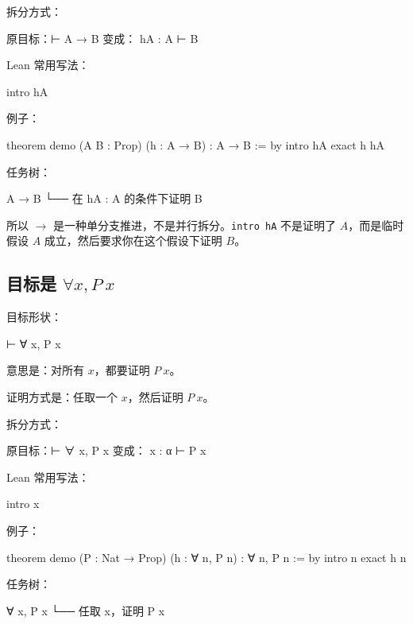 \documentclass[UTF8,12pt]{ctexart}
\begin{document}
拆分方式：

\begin{Tree}
原目标：⊢ A → B
变成：
hA : A
⊢ B
\end{Tree}

Lean 常用写法：

\begin{LeanCode}
intro hA
\end{LeanCode}

例子：

\begin{LeanCode}
theorem demo
  (A B : Prop)
  (h : A → B) :
  A → B := by
  intro hA
  exact h hA
\end{LeanCode}

任务树：

\begin{Tree}
A → B
└── 在 hA : A 的条件下证明 B
\end{Tree}

所以 \(\to\) 是一种单分支推进，不是并行拆分。\texttt{intro hA} 不是证明了 \(A\)，而是临时假设 \(A\) 成立，然后要求你在这个假设下证明 \(B\)。

\subsection{目标是 \(\forall x, P\ x\)}

目标形状：

\begin{LeanCode}
⊢ ∀ x, P x
\end{LeanCode}

意思是：对所有 \(x\)，都要证明 \(P\ x\)。

证明方式是：任取一个 \(x\)，然后证明 \(P\ x\)。

拆分方式：

\begin{Tree}
原目标：⊢ ∀ x, P x
变成：
x : α
⊢ P x
\end{Tree}

Lean 常用写法：

\begin{LeanCode}
intro x
\end{LeanCode}

例子：

\begin{LeanCode}
theorem demo
  (P : Nat → Prop)
  (h : ∀ n, P n) :
  ∀ n, P n := by
  intro n
  exact h n
\end{LeanCode}

任务树：

\begin{Tree}
∀ x, P x
└── 任取 x，证明 P x
\end{Tree}
\end{document}
